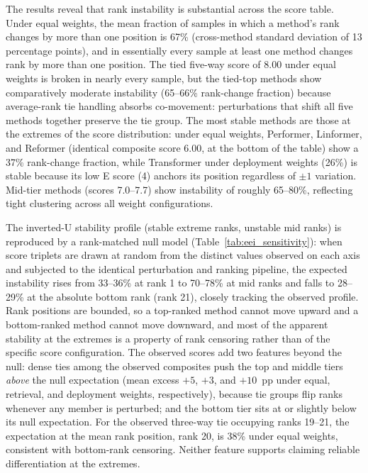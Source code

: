 \documentclass[10pt,twocolumn]{article}
\begin{document}
The results reveal that rank instability is substantial across the score table. Under equal weights, the mean fraction of samples in which a method's rank changes by more than one position is 67\% (cross-method standard deviation of 13 percentage points), and in essentially every sample at least one method changes rank by more than one position. The tied five-way score of 8.00 under equal weights is broken in nearly every sample, but the tied-top methods show comparatively moderate instability (65--66\% rank-change fraction) because average-rank tie handling absorbs co-movement: perturbations that shift all five methods together preserve the tie group. The most stable methods are those at the extremes of the score distribution: under equal weights, Performer, Linformer, and Reformer (identical composite score 6.00, at the bottom of the table) show a 37\% rank-change fraction, while Transformer under deployment weights (26\%) is stable because its low E score (4) anchors its position regardless of $\pm1$ variation. Mid-tier methods (scores 7.0--7.7) show instability of roughly 65--80\%, reflecting tight clustering across all weight configurations.

The inverted-U stability profile (stable extreme ranks, unstable mid ranks) is reproduced by a rank-matched null model (Table~\ref{tab:eei_sensitivity}): when score triplets are drawn at random from the distinct values observed on each axis and subjected to the identical perturbation and ranking pipeline, the expected instability rises from 33--36\% at rank 1 to 70--78\% at mid ranks and falls to 28--29\% at the absolute bottom rank (rank 21), closely tracking the observed profile. Rank positions are bounded, so a top-ranked method cannot move upward and a bottom-ranked method cannot move downward, and most of the apparent stability at the extremes is a property of rank censoring rather than of the specific score configuration. The observed scores add two features beyond the null: dense ties among the observed composites push the top and middle tiers \emph{above} the null expectation (mean excess $+5$, $+3$, and $+10$~pp under equal, retrieval, and deployment weights, respectively), because tie groups flip ranks whenever any member is perturbed; and the bottom tier sits at or slightly below its null expectation. For the observed three-way tie occupying ranks 19--21, the expectation at the mean rank position, rank 20, is 38\% under equal weights, consistent with bottom-rank censoring. Neither feature supports claiming reliable differentiation at the extremes.
\end{document}
